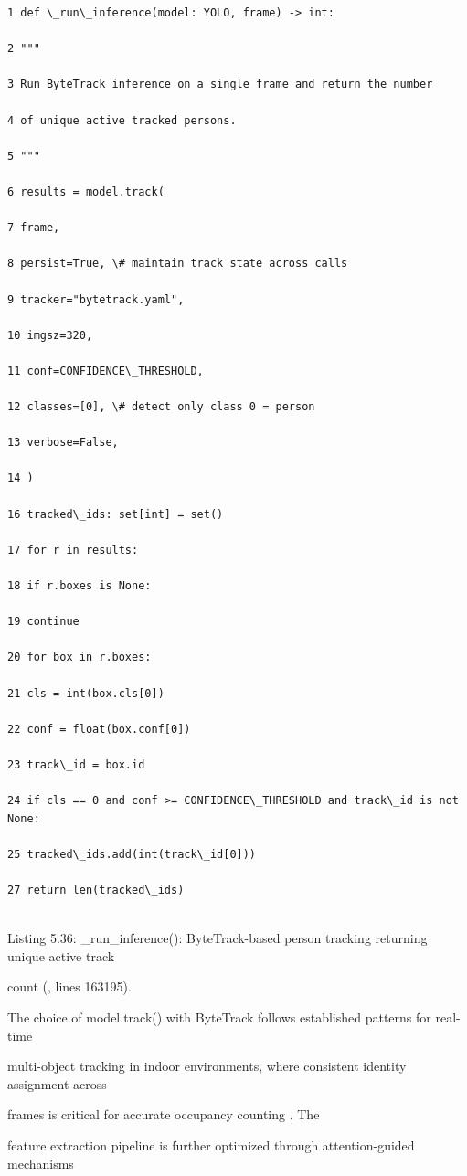 \begin{listingbox}
	\begin{verbatim}
1 def \_run\_inference(model: YOLO, frame) -> int:

2 """

3 Run ByteTrack inference on a single frame and return the number

4 of unique active tracked persons.

5 """

6 results = model.track(

7 frame,

8 persist=True, \# maintain track state across calls

9 tracker="bytetrack.yaml",

10 imgsz=320,

11 conf=CONFIDENCE\_THRESHOLD,

12 classes=[0], \# detect only class 0 = person

13 verbose=False,

14 )

16 tracked\_ids: set[int] = set()

17 for r in results:

18 if r.boxes is None:

19 continue

20 for box in r.boxes:

21 cls = int(box.cls[0])

22 conf = float(box.conf[0])

23 track\_id = box.id

24 if cls == 0 and conf >= CONFIDENCE\_THRESHOLD and track\_id is not None:

25 tracked\_ids.add(int(track\_id[0]))

27 return len(tracked\_ids)


\end{verbatim}
\end{listingbox}
Listing 5.36: \_run\_inference(): ByteTrack-based person tracking returning unique active track

count (, lines 163195).

The choice of model.track() with ByteTrack follows established patterns for real-time

multi-object tracking in indoor environments, where consistent identity assignment across

frames is critical for accurate occupancy counting \cite{kumar2024,elsayed2026}. The

feature extraction pipeline is further optimized through attention-guided mechanisms

